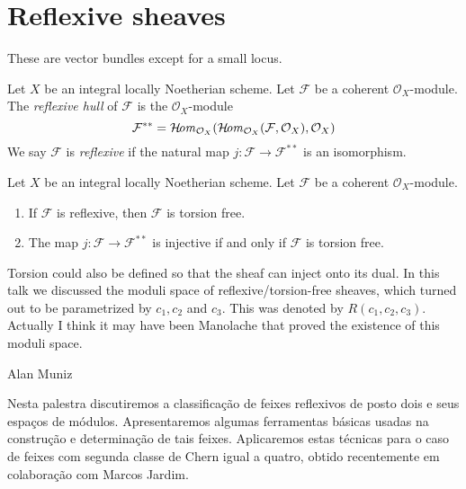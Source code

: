 \section{Reflexive sheaves}
\label{section-reflexive-sheaves}

\begin{slogan}
These are vector bundles except for a small locus.
\end{slogan}

\begin{definition}
\label{definition-reflexive}
Let $X$ be an integral locally Noetherian scheme. Let $\mathcal{F}$
be a coherent $\mathcal{O}_X$-module. The {\it reflexive hull}
of $\mathcal{F}$ is the $\mathcal{O}_X$-module
$$
\mathcal{F}^{**} = \mathop{\mathcal{H}\!\mathit{om}}\nolimits_{\mathcal{O}_X}(
\mathop{\mathcal{H}\!\mathit{om}}\nolimits_{\mathcal{O}_X}(\mathcal{F}, \mathcal{O}_X), \mathcal{O}_X)
$$
We say $\mathcal{F}$ is {\it reflexive} if the natural map
$j : \mathcal{F} \longrightarrow \mathcal{F}^{**}$
is an isomorphism.
\end{definition}

\begin{lemma}
\label{lemma-reflexive-torsion-free}
Let $X$ be an integral locally Noetherian scheme. Let $\mathcal{F}$
be a coherent $\mathcal{O}_X$-module.
\begin{enumerate}
\item If $\mathcal{F}$ is reflexive, then $\mathcal{F}$ is torsion free.
\item The map $j : \mathcal{F} \longrightarrow \mathcal{F}^{**}$
is injective if and only if $\mathcal{F}$ is torsion free.
\end{enumerate}
\end{lemma}

\begin{remark}\leavevmode
\label{remark-reflexive-talk}
Torsion could also be defined so that the sheaf can inject onto its dual. In
this talk we discussed the moduli space of reflexive/torsion-free sheaves, which
turned out to be parametrized by $c_1, c_2$ and $c_3$. This was denoted by 
$R(c_1,c_2,c_3)$. Actually I think it may have been Manolache that proved the
existence of this moduli space.


Alan Muniz

Nesta palestra discutiremos a classificação de feixes reflexivos de posto dois e
seus espaços de módulos. Apresentaremos algumas ferramentas básicas usadas na
construção e determinação de tais feixes. Aplicaremos estas técnicas para o caso
de feixes com segunda classe de Chern igual a quatro, obtido recentemente em
colaboração com Marcos Jardim.
\end{remark}

